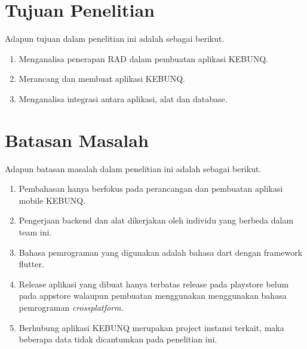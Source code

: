 \begin{flushleft}
\begin{enumerate}
  
\end{enumerate}
\vspace{2cm}

\section{Tujuan Penelitian}

\begin{justify}
  Adapun tujuan dalam penelitian ini adalah sebagai berikut.


\end{justify}
\begin{enumerate}
  \item Menganalisa penerapan RAD dalam pembuatan aplikasi KEBUNQ.
  \item Merancang dan membuat aplikasi KEBUNQ.
  \item Menganalisa integrasi antara aplikasi, alat dan database.
  
  \end{enumerate}
\vspace{2cm}

\section{Batasan Masalah}

\begin{justify}
  Adapun batasan masalah dalam penelitian ini adalah sebagai berikut.


\end{justify}
\begin{enumerate}
  \item Pembahasan hanya berfokus pada perancangan dan pembuatan aplikasi mobile KEBUNQ.
  \item Pengerjaan backend dan alat dikerjakan oleh individu yang berbeda dalam team ini.
  \item Bahasa pemrograman yang digunakan adalah bahasa dart dengan framework flutter.
  \item Release aplikasi yang dibuat hanya terbatas release pada playstore belum pada appstore walaupun pembuatan menggunakan menggunakan bahasa pemrograman \textit{crossplatform}.
  \item Berhubung aplikasi KEBUNQ merupakan project instansi terkait, maka beberapa data tidak dicantumkan pada penelitian ini.

  \end{enumerate}
\vspace{2cm}



\end{flushleft}
